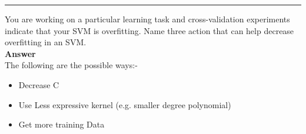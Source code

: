 \documentclass[12pt]{exam}
\begin{document}
\noindent
\rule[2ex]{\textwidth}{2pt}
\begin{questions}

\question[3] You are working on a particular learning task and cross-validation experiments indicate that your SVM is overfitting. Name three action that can help decrease overfitting in an SVM.\\
\textbf{Answer}\\
The following are the possible ways:- \\
\begin{itemize}
    \item Decrease C
    \item Use Less expressive kernel (e.g. smaller degree polynomial)
    \item Get more training Data
\end{itemize}
\addpoints


\end{questions}
\end{document}
